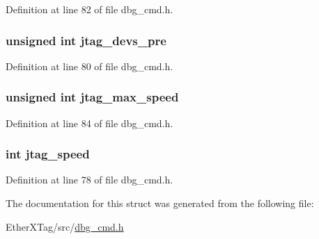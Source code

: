Definition at line 82 of file dbg\-\_\-cmd.\-h.

\hypertarget{structdbg__cmd__type__connect_aac2104a47b226a8d04018b775a3b9fd5}{
\subsubsection[{jtag\-\_\-devs\-\_\-pre}]{\setlength{\rightskip}{0pt plus 5cm}unsigned int jtag\-\_\-devs\-\_\-pre}}\label{structdbg__cmd__type__connect_aac2104a47b226a8d04018b775a3b9fd5}


Definition at line 80 of file dbg\-\_\-cmd.\-h.

\hypertarget{structdbg__cmd__type__connect_afab09200baf8322f1d8e65fc4669c32c}{
\subsubsection[{jtag\-\_\-max\-\_\-speed}]{\setlength{\rightskip}{0pt plus 5cm}unsigned int jtag\-\_\-max\-\_\-speed}}\label{structdbg__cmd__type__connect_afab09200baf8322f1d8e65fc4669c32c}


Definition at line 84 of file dbg\-\_\-cmd.\-h.

\hypertarget{structdbg__cmd__type__connect_a46e35e0c4106e70b82f3a8961e735ab2}{
\subsubsection[{jtag\-\_\-speed}]{\setlength{\rightskip}{0pt plus 5cm}int jtag\-\_\-speed}}\label{structdbg__cmd__type__connect_a46e35e0c4106e70b82f3a8961e735ab2}


Definition at line 78 of file dbg\-\_\-cmd.\-h.



The documentation for this struct was generated from the following file\-:\begin{DoxyCompactItemize}
\item 
Ether\-X\-Tag/src/\hyperlink{dbg__cmd_8h}{dbg\-\_\-cmd.\-h}\end{DoxyCompactItemize}

